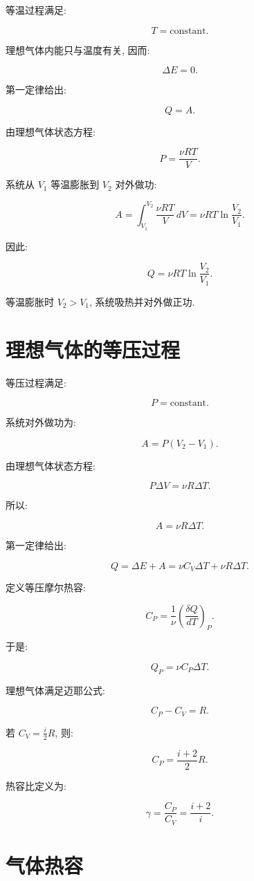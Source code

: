 \documentclass[
  a4paper,
]{ctexrep}
\begin{document}
等温过程满足:

\[
T=\mathrm{constant}.
\]

理想气体内能只与温度有关, 因而:

\[
\Delta E=0.
\]

第一定律给出:

\[
Q=A.
\]

由理想气体状态方程:

\[
P=\frac{\nu RT}{V}.
\]

系统从 \(V_1\) 等温膨胀到 \(V_2\) 对外做功:

\[
A=\int_{V_1}^{V_2}\frac{\nu RT}{V}\,dV
=\nu RT\ln\frac{V_2}{V_1}.
\]

因此:

\[
Q=\nu RT\ln\frac{V_2}{V_1}.
\]

等温膨胀时 \(V_2>V_1\), 系统吸热并对外做正功.

\section{理想气体的等压过程}\label{ux7406ux60f3ux6c14ux4f53ux7684ux7b49ux538bux8fc7ux7a0b}

等压过程满足:

\[
P=\mathrm{constant}.
\]

系统对外做功为:

\[
A=P(V_2-V_1).
\]

由理想气体状态方程:

\[
P\Delta V=\nu R\Delta T.
\]

所以:

\[
A=\nu R\Delta T.
\]

第一定律给出:

\[
Q=\Delta E+A=\nu C_V\Delta T+\nu R\Delta T.
\]

定义等压摩尔热容:

\[
C_P=\frac{1}{\nu}\left(\frac{\delta Q}{dT}\right)_P.
\]

于是:

\[
Q_P=\nu C_P\Delta T.
\]

理想气体满足迈耶公式:

\[
C_P-C_V=R.
\]

若 \(C_V=\frac{i}{2}R\), 则:

\[
C_P=\frac{i+2}{2}R.
\]

热容比定义为:

\[
\gamma=\frac{C_P}{C_V}=\frac{i+2}{i}.
\]

\section{气体热容}\label{ux6c14ux4f53ux70edux5bb9}
\end{document}
